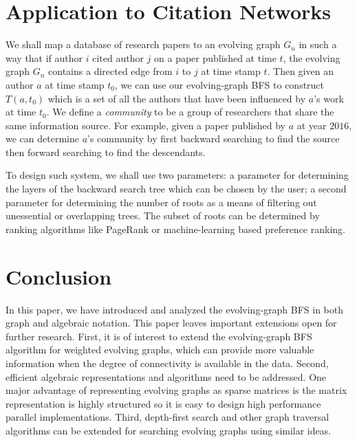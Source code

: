 \documentclass[11pt,conference,compsocconf]{IEEEtran}
\theoremstyle{definition}
\begin{document}
\section{Application to Citation Networks}
\label{sec:applications}

We shall map a database of research papers to an evolving graph $G_n$
in such a way that if author $i$ cited author $j$ on a paper published
at  time $t$, the evolving graph $G_n$ contains a directed edge from
$i$ to $j$ at time stamp $t$. Then given an author $a$ at time stamp $t_0$,
we can use our evolving-graph BFS to construct $T(a, t_0)$ which is
a set of all the authors that have been influenced by $a$'s work at
time $t_0$. We define a \emph{community} to be a group of
researchers that share the same information source.
For example, given a paper published by $a$ at year $2016$,
we can determine $a$'s community by first backward searching to
find the source then forward searching to find the descendants.

To design such system, we shall use two parameters:
 a parameter for
determining the layers of the backward search tree which can be chosen by the user;
a second parameter for determining the number of roots as a means of
filtering out unessential or overlapping trees. The subset of roots can be determined
by ranking algorithms like PageRank or machine-learning based preference ranking.


\section{Conclusion}

In this paper, we have introduced and analyzed the evolving-graph BFS in both
graph and algebraic notation.
This paper leaves important extensions open for further research. First, it is
of interest to extend the evolving-graph BFS algorithm for weighted evolving graphs, which can provide more valuable information when the degree of connectivity is available in the data.
Second, efficient algebraic representations and algorithms need to be addressed.
One major advantage of representing evolving graphs as sparse matrices
is the matrix representation is highly structured so it is easy to design
high performance parallel implementations.
Third, depth-first search and other graph traversal algorithms can be
extended for searching evolving graphs using similar ideas.


\end{document}
